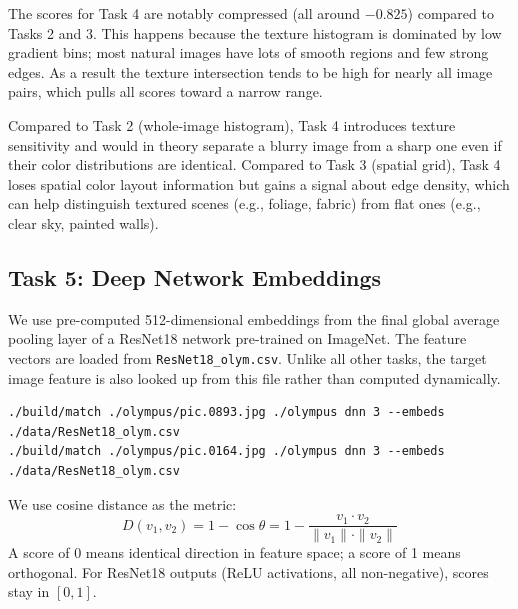 \documentclass[11pt,letterpaper]{article}
\begin{document}
The scores for Task 4 are notably compressed (all around $-0.825$) compared to
Tasks 2 and 3. This happens because the texture histogram is dominated by low
gradient bins; most natural images have lots of smooth regions and few strong
edges. As a result the texture intersection tends to be high for nearly all
image pairs, which pulls all scores toward a narrow range.

Compared to Task 2 (whole-image histogram), Task 4 introduces texture
sensitivity and would in theory separate a blurry image from a sharp one even
if their color distributions are identical. Compared to Task 3 (spatial grid),
Task 4 loses spatial color layout information but gains a signal about edge
density, which can help distinguish textured scenes (e.g., foliage, fabric)
from flat ones (e.g., clear sky, painted walls).

\subsection*{Task 5: Deep Network Embeddings}

We use pre-computed 512-dimensional embeddings from the final global average
pooling layer of a ResNet18 network pre-trained on ImageNet. The feature vectors
are loaded from \texttt{ResNet18\_olym.csv}. Unlike all other tasks, the target
image feature is also looked up from this file rather than computed dynamically.

\begin{verbatim}
./build/match ./olympus/pic.0893.jpg ./olympus dnn 3 --embeds ./data/ResNet18_olym.csv
./build/match ./olympus/pic.0164.jpg ./olympus dnn 3 --embeds ./data/ResNet18_olym.csv
\end{verbatim}

We use cosine distance as the metric:
\[
D(v_1, v_2) = 1 - \cos\theta = 1 - \frac{v_1 \cdot v_2}{\|v_1\| \cdot \|v_2\|}
\]
A score of 0 means identical direction in feature space; a score of 1 means
orthogonal. For ResNet18 outputs (ReLU activations, all non-negative), scores
stay in $[0, 1]$.
\end{document}
